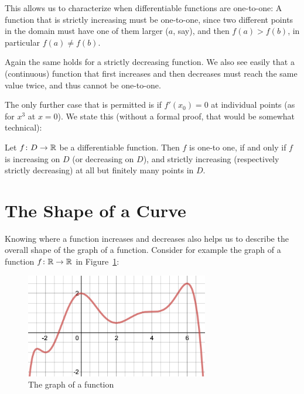 This allows us to characterize when differentiable functions are one-to-one:
A function that is strictly increasing must be one-to-one, since two
different points in the domain must have one of them larger ($a$, say), and
then $f(a)>f(b)$, in particular $f(a)\not=f(b)$.

Again the same holds for a strictly decreasing function. We also see easily
that a (continuous) function that first increases and then decreases must
reach the same value twice, and thus cannot be one-to-one.

The only further
case that is permitted is if $f'(x_0)=0$ at individual points (as for $x^3$ at
$x=0$). We state this (without a formal proof, that would be somewhat
technical):
\begin{lemma}
Let $f\colon D\to{\mathbb R}$ be a differentiable function. Then $f$ is one-to one, if
and only if $f$ is increasing on $D$ (or decreasing on $D$), and strictly
increasing (respectively strictly decreasing) at all but finitely many
points in $D$.
\end{lemma}

\section{The Shape of a Curve}
\label{secshape}

Knowing where a function increases and decreases also helps us to describe
the overall shape of the graph of a function. Consider for example the
graph
of a function $f\colon{\mathbb R}\to{\mathbb R}$ in Figure~\ref{figkurvdiss1}:
\begin{figure}
\begin{center}
\includegraphics[width=8cm]{pic/kurvdiss1.png}
\end{center}
\caption{The graph of a function}
\label{figkurvdiss1}
\end{figure}

